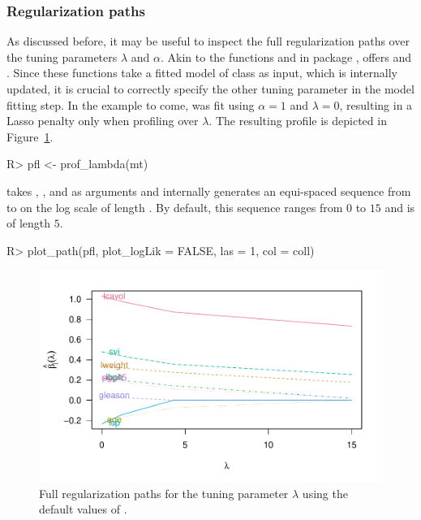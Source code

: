 \subsubsection{Regularization paths} \label{subsec:prof}

As discussed before, it may be useful to inspect the full regularization paths
over the tuning parameters $\lambda$ and $\alpha$. Akin to the functions 
and  in package ,  offers 
and . Since these functions take a fitted model of class
 as input, which is internally updated, it is crucial to correctly
specify the other tuning parameter in the model fitting step. In the example to
come,  was fit using $\alpha = 1$ and $\lambda = 0$, resulting in a
Lasso penalty only when profiling over $\lambda$. The resulting profile is depicted
in Figure~\ref{fig:prof}.
\begin{example}
R> pfl <- prof_lambda(mt)
\end{example}
 takes , , and 
as arguments and internally generates an equi-spaced sequence from 
to  on the log scale of length . By default, this
sequence ranges from $0$ to $15$ and is of length $5$.
\begin{example}
R> plot_path(pfl, plot_logLik = FALSE, las = 1, col = coll)
\end{example}

\begin{figure}
\includegraphics[width=1\textwidth]{profiling_plot-1} 
\caption{Full regularization paths for the tuning parameter $\lambda$ using the
default values of .}
\label{fig:prof}
\end{figure}

